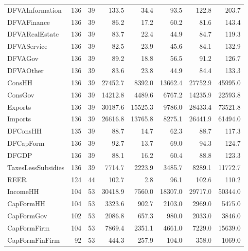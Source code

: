 {\begin{tabular}[t]{lrrrrrrr}
DFVAInformation & 136 & 39 & \num{133.5} & \num{34.4} & \num{93.5} & \num{122.8} & \num{203.7}\\
DFVAFinance & 136 & 39 & \num{86.2} & \num{17.2} & \num{60.2} & \num{81.6} & \num{143.4}\\
DFVARealEstate & 136 & 39 & \num{83.7} & \num{22.4} & \num{44.9} & \num{84.7} & \num{119.3}\\
DFVAService & 136 & 39 & \num{82.5} & \num{23.9} & \num{45.6} & \num{84.1} & \num{132.9}\\
DFVAGov & 136 & 39 & \num{89.2} & \num{18.8} & \num{56.5} & \num{91.2} & \num{126.7}\\
DFVAOther & 136 & 39 & \num{83.6} & \num{23.8} & \num{44.9} & \num{84.4} & \num{133.3}\\
ConsHH & 136 & 39 & \num{27452.7} & \num{8392.0} & \num{13662.4} & \num{27752.9} & \num{45995.0}\\
ConsGov & 136 & 39 & \num{14212.8} & \num{4489.6} & \num{6767.2} & \num{14235.9} & \num{22593.8}\\
Exports & 136 & 39 & \num{30187.6} & \num{15525.3} & \num{9786.0} & \num{28433.4} & \num{73521.8}\\
Imports & 136 & 39 & \num{26616.8} & \num{13765.8} & \num{8275.1} & \num{26441.9} & \num{61494.0}\\
DFConsHH & 135 & 39 & \num{88.7} & \num{14.7} & \num{62.3} & \num{88.7} & \num{117.3}\\
DFCapForm & 136 & 39 & \num{92.7} & \num{13.7} & \num{69.0} & \num{94.3} & \num{124.7}\\
DFGDP & 136 & 39 & \num{88.1} & \num{16.2} & \num{60.4} & \num{88.8} & \num{123.3}\\
TaxesLessSubsidies & 136 & 39 & \num{7714.7} & \num{2223.9} & \num{3485.7} & \num{8289.1} & \num{11772.7}\\
REER & 124 & 44 & \num{102.7} & \num{2.8} & \num{96.1} & \num{102.6} & \num{110.2}\\
IncomeHH & 104 & 53 & \num{30418.9} & \num{7560.0} & \num{18307.0} & \num{29717.0} & \num{50344.0}\\
CapFormHH & 104 & 53 & \num{3323.6} & \num{902.7} & \num{2103.0} & \num{2969.0} & \num{5475.0}\\
CapFormGov & 102 & 53 & \num{2086.8} & \num{657.3} & \num{980.0} & \num{2033.0} & \num{3846.0}\\
CapFormFirm & 104 & 53 & \num{7869.4} & \num{2351.1} & \num{4661.0} & \num{7229.0} & \num{15639.0}\\
CapFormFinFirm & 92 & 53 & \num{444.3} & \num{257.9} & \num{104.0} & \num{358.0} & \num{1069.0}\\

\end{tabular}}
